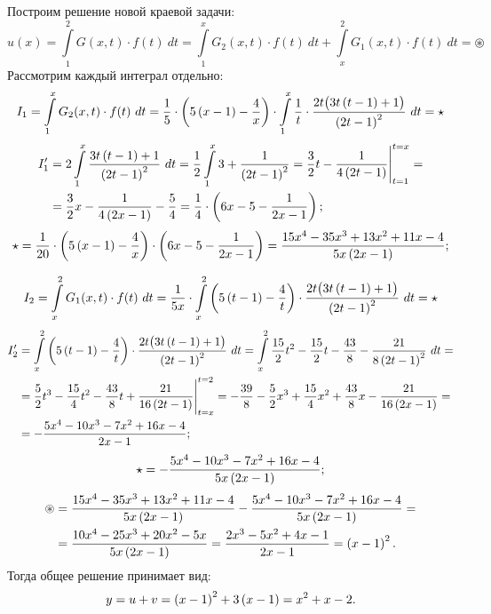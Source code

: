 		Построим решение новой краевой задачи:
		\[ u(x) = \int\limits_1^2 G(x, t) \cdot f(t) ~ dt = \int\limits_1^x G_2(x, t) \cdot f(t) ~ dt + \int\limits_x^2 G_1(x, t) \cdot f(t) ~ dt = \circledast \]
		Рассмотрим каждый интеграл отдельно:
		\[
			I_1 = \int\limits_1^x G_2(x, t) \cdot f(t) ~ dt = \frac{1}{5} \cdot \left( 5 \left( x - 1 \right) - \frac{4}{x} \right) \cdot \int\limits_1^x \frac{1}{t} \cdot \frac{2t \bigl( 3t \left( t - 1 \right) + 1 \bigr)}{\left( 2t - 1 \right)^2} ~ dt = \star
		\]
		\[ \begin{split} 
			I'_1 &= 2 \int\limits_1^x \frac{3t \left( t - 1 \right) + 1}{\left( 2t - 1 \right)^2} ~ dt = \frac{1}{2} \int\limits_1^x 3 + \frac{1}{\left( 2t - 1 \right)^2} = \frac{3}{2} t - \frac{1}{4 \left( 2t - 1 \right)} \Biggl\vert \Biggr._{t = 1}^{t = x} = \\
			&= \frac{3}{2} x - \frac{1}{4 \left( 2x - 1 \right)} - \frac{5}{4} = \frac{1}{4} \cdot \left( 6x - 5 - \frac{1}{2x - 1} \right);
		\end{split} \]
		\[ 
			\star = \frac{1}{20} \cdot \left( 5 \left( x - 1 \right) - \frac{4}{x} \right) \cdot \left( 6x - 5 - \frac{1}{2x - 1} \right) = \frac{15x^4 - 35 x^3 + 13x^2 + 11x - 4}{5x \left( 2x - 1 \right)};
		\]

		\[ 
			I_2 = \int\limits_x^2 G_1(x, t) \cdot f(t) ~ dt = \frac{1}{5x} \cdot \int\limits_x^2 \left( 5 \left( t - 1 \right) - \frac{4}{t} \right) \cdot \frac{2t \bigl( 3t \left( t - 1 \right) + 1 \bigr)}{\left( 2t - 1 \right)^2} ~ dt = \star
		\]
		\[ \begin{split}
			I'_2 &= \int\limits_x^2 \left( 5 \left( t - 1 \right) - \frac{4}{t} \right) \cdot \frac{2t \bigl( 3t \left( t - 1 \right) + 1 \bigr)}{\left( 2t - 1 \right)^2} ~ dt = \int\limits_x^2 \frac{15}{2} t^2 - \frac{15}{2} t - \frac{43}{8} - \frac{21}{8 \left( 2t - 1 \right)^2} ~ dt = \\
			&= \frac{5}{2} t^3 - \frac{15}{4} t^2 - \frac{43}{8} t + \frac{21}{16\left( 2t - 1 \right)} \Biggl\vert \Biggr._{t = x}^{t = 2} = -\frac{39}{8} - \frac{5}{2} x^3 + \frac{15}{4} x^2 + \frac{43}{8} x - \frac{21}{16\left( 2x - 1 \right)} = \\
			&= -\frac{5x^4 - 10x^3 - 7x^2 + 16x - 4}{2x - 1};
		\end{split} \]
		\[ 
			\star = -\frac{5x^4 - 10x^3 - 7x^2 + 16x - 4}{5x \left( 2x - 1 \right)};
		\]
		\[ \begin{split}
			\circledast &= \frac{15x^4 - 35 x^3 + 13x^2 + 11x - 4}{5x \left( 2x - 1 \right)} - \frac{5x^4 - 10x^3 - 7x^2 + 16x - 4}{5x \left( 2x - 1 \right)} = \\
			&= \frac{10x^4 - 25 x^3 + 20x^2 - 5x}{5x \left( 2x - 1 \right)} = \frac{2x^3 - 5x^2 + 4x - 1}{2x - 1} = \left( x-1 \right)^2.
		\end{split} \]
		Тогда общее решение принимает вид:
		\[ y = u + v = \left( x-1 \right)^2 + 3 \left( x-1 \right) = x^2 + x - 2. \]


